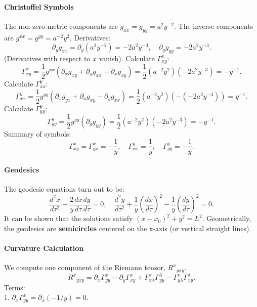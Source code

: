 \documentclass[11pt, a4paper]{report}
\begin{document}
\paragraph{Christoffel Symbols}
The non-zero metric components are $g_{xx} = g_{yy} = a^2 y^{-2}$.
The inverse components are $g^{xx} = g^{yy} = a^{-2} y^2$.
Derivatives:
\begin{equation}
\partial_y g_{xx} = \partial_y (a^2 y^{-2}) = -2a^2 y^{-3}, \quad \partial_y g_{yy} = -2a^2 y^{-3}.
\end{equation}
(Derivatives with respect to $x$ vanish).
Calculate $\Gamma^x_{xy}$:
\begin{equation}
\Gamma^x_{xy} = \frac{1}{2} g^{xx} (\partial_x g_{xy} + \partial_y g_{xx} - \partial_x g_{xy}) = \frac{1}{2} (a^{-2} y^2) (-2a^2 y^{-3}) = -y^{-1}.
\end{equation}
Calculate $\Gamma^y_{xx}$:
\begin{equation}
\Gamma^y_{xx} = \frac{1}{2} g^{yy} (\partial_x g_{yx} + \partial_x g_{xy} - \partial_y g_{xx}) = \frac{1}{2} (a^{-2} y^2) (-(-2a^2 y^{-3})) = y^{-1}.
\end{equation}
Calculate $\Gamma^y_{yy}$:
\begin{equation}
\Gamma^y_{yy} = \frac{1}{2} g^{yy} (\partial_y g_{yy}) = \frac{1}{2} (a^{-2} y^2) (-2a^2 y^{-3}) = -y^{-1}.
\end{equation}
Summary of symbols:
\begin{equation}
\Gamma^x_{xy} = \Gamma^x_{yx} = -\frac{1}{y}, \quad \Gamma^y_{xx} = \frac{1}{y}, \quad \Gamma^y_{yy} = -\frac{1}{y}.
\end{equation}

\paragraph{Geodesics}
The geodesic equations turn out to be:
\begin{equation}
\frac{d^2 x}{d\tau^2} - \frac{2}{y} \frac{dx}{d\tau} \frac{dy}{d\tau} = 0, \quad \frac{d^2 y}{d\tau^2} + \frac{1}{y} \left( \frac{dx}{d\tau} \right)^2 - \frac{1}{y} \left( \frac{dy}{d\tau} \right)^2 = 0.
\end{equation}
It can be shown that the solutions satisfy $(x-x_0)^2 + y^2 = L^2$.
Geometrically, the geodesics are \textbf{semicircles} centered on the x-axis (or vertical straight lines).

\paragraph{Curvature Calculation}
We compute one component of the Riemann tensor, ${R^x}_{yxy}$.
\begin{equation}
{R^x}_{yxy} = \partial_x \Gamma^x_{yy} - \partial_y \Gamma^x_{xy} + \Gamma^x_{x\lambda} \Gamma^\lambda_{yy} - \Gamma^x_{y\lambda} \Gamma^\lambda_{xy}.
\end{equation}
Terms:\\
1. $\partial_x \Gamma^x_{yy} = \partial_x (-1/y) = 0$.\\
\end{document}
